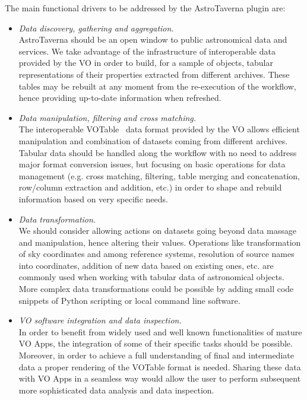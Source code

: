 \documentclass{aa}
\begin{document}
The main functional drivers to be addressed by the AstroTaverna plugin are:
\begin{itemize}
\item
\textit{Data discovery, gathering and aggregation.}\\
AstroTaverna should be an open window to public astronomical data and services. We take advantage of the infrastructure of interoperable data provided by the VO in order to build, for a sample of objects, tabular representations of their properties extracted from different archives. These tables may be rebuilt at any moment from the re-execution of the workflow, hence providing up-to-date information when refreshed.
\item
\textit{Data manipulation, filtering and cross matching.}\\
The interoperable VOTable~\citep{Ochsenbein2009} data format provided by the VO allows efficient manipulation and combination of datasets coming from different archives. Tabular data should be handled along the workflow with no need to address major format conversion issues, but focusing on basic operations for data management (e.g. cross matching, filtering, table merging and concatenation, row/column extraction and addition, etc.) in order to shape and rebuild information based on very specific needs.
\item
\textit{Data transformation.}\\
We should consider allowing actions on datasets going beyond data massage and manipulation, hence altering their values. Operations like transformation of sky coordinates and among reference systems, resolution of source names into coordinates, addition of new data based on existing ones, etc. are commonly used when working with tabular data of astronomical objects. More complex data transformations could be possible by adding small code snippets of Python scripting or local command line software.
\item
\textit{VO software integration and data inspection.}\\
In order to benefit from widely used and well known functionalities of mature VO Apps, the integration of some of their specific tasks should be possible. Moreover, in order to achieve a full understanding of final and intermediate data a proper rendering of the VOTable format is needed. Sharing these data with VO Apps in a seamless way would allow the user to perform subsequent more sophisticated data analysis and data inspection.
\end{itemize}
\end{document}
